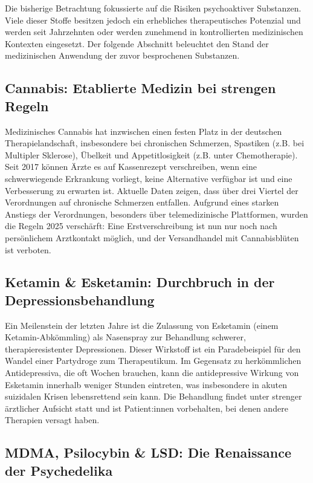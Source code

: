 \documentclass[11pt,a4paper]{article}
\begin{document}
	Die bisherige Betrachtung fokussierte auf die Risiken psychoaktiver Substanzen. Viele dieser Stoffe besitzen jedoch ein erhebliches therapeutisches Potenzial und werden seit Jahrzehnten oder werden zunehmend in kontrollierten medizinischen Kontexten eingesetzt. Der folgende Abschnitt beleuchtet den Stand der medizinischen Anwendung der zuvor besprochenen Substanzen.
	
	\subsection{Cannabis: Etablierte Medizin bei strengen Regeln}
	
	Medizinisches Cannabis hat inzwischen einen festen Platz in der deutschen Therapielandschaft, insbesondere bei chronischen Schmerzen, Spastiken (z.B. bei Multipler Sklerose), Übelkeit und Appetitlosigkeit (z.B. unter Chemotherapie). Seit 2017 können Ärzte es auf Kassenrezept verschreiben, wenn eine schwerwiegende Erkrankung vorliegt, keine Alternative verfügbar ist und eine Verbesserung zu erwarten ist. Aktuelle Daten zeigen, dass über drei Viertel der Verordnungen auf chronische Schmerzen entfallen. Aufgrund eines starken Anstiegs der Verordnungen, besonders über telemedizinische Plattformen, wurden die Regeln 2025 verschärft: Eine Erstverschreibung ist nun nur noch nach persönlichem Arztkontakt möglich, und der Versandhandel mit Cannabisblüten ist verboten.\cite{medical-cannabis}
	
	\subsection{Ketamin \& Esketamin: Durchbruch in der Depressionsbehandlung}
	
	Ein Meilenstein der letzten Jahre ist die Zulassung von Esketamin (einem Ketamin-Abkömmling) als Nasenspray zur Behandlung schwerer, therapieresistenter Depressionen. Dieser Wirkstoff ist ein Paradebeispiel für den Wandel einer Partydroge zum Therapeutikum. Im Gegensatz zu herkömmlichen Antidepressiva, die oft Wochen brauchen, kann die antidepressive Wirkung von Esketamin innerhalb weniger Stunden eintreten, was insbesondere in akuten suizidalen Krisen lebensrettend sein kann. Die Behandlung findet unter strenger ärztlicher Aufsicht statt und ist Patient:innen vorbehalten, bei denen andere Therapien versagt haben.\cite{esketamine}
	
	\subsection{MDMA, Psilocybin \& LSD: Die Renaissance der Psychedelika}
	
\end{document}
